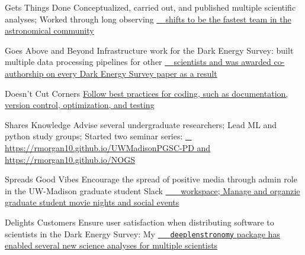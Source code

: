 
\begin{cvskills}
  \cvskill
    {Gets Things Done} %
    {Conceptualized, carried out, and published multiple scientific analyses; Worked through long observing \underline{{\color{white}\_ }  shifts to be the fastest team in the astronomical community}} %

  \cvskill
    {Goes Above and Beyond} %
    {Infrastructure work for the Dark Energy Survey: built multiple data processing pipelines for other \underline{{\color{white}\_ } scientists and was awarded co-authorship on every Dark Energy Survey paper as a result}} %
    
  \cvskill
    {Doesn't Cut Corners} %
    {\underline{Follow best practices for coding, such as documentation, version control, optimization, and testing}} %
    
  \cvskill
    {Shares Knowledge} %
    {Advise several undergraduate researchers; Lead ML and python study groups; Started two seminar series: \underline{{\color{white}\_ } \url{https://rmorgan10.github.io/UWMadisonPGSC-PD}  and  \url{https://rmorgan10.github.io/NOGS}}} %
    
  \cvskill
    {Spreads Good Vibes} %
    {Encourage the  spread of positive media through admin role in the UW-Madison graduate student Slack \underline{{\color{white} \_\_} workspace; Manage and organzie graduate student movie nights and social events}} %
    
  \cvskill
    {Delights Customers} %
    {Ensure user satisfaction when distributing software to scientists in the Dark Energy Survey: My \underline{{\color{white} \_\_}\texttt{deeplenstronomy} package has enabled several new science analyses for multiple scientists}} %

\end{cvskills}
